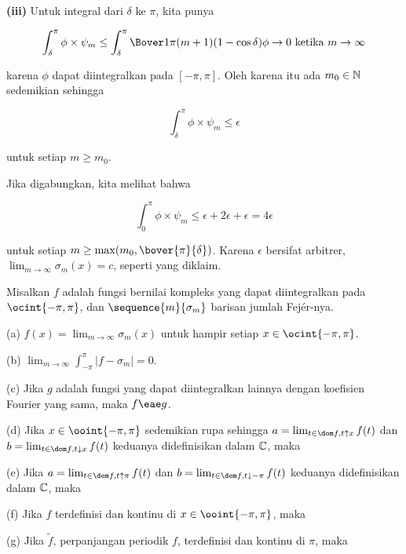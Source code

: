 {\medskip

{\bf (iii)} Untuk integral dari $\delta$ ke $\pi$, kita punya

$$\int_{\delta}^{\pi}\phi\times\psi_m
\le\int_{\delta}^{\pi}\Bover1{\pi(m+1)(1-\cos\delta)}\phi
\to 0\text{ ketika }m\to\infty$$

\noindent karena $\phi$ dapat diintegralkan pada $[-\pi,\pi]$.   Oleh karena itu
ada $m_0\in\Bbb N$ sedemikian sehingga

$$\int_{\delta}^{\pi}\phi\times\psi_m\le\epsilon$$

\noindent untuk setiap $m\ge m_0$.

\medskip

Jika digabungkan, kita melihat bahwa

$$\int_0^{\pi}\phi\times\psi_m
\le\epsilon+2\epsilon
+\epsilon= 4\epsilon$$

\noindent untuk setiap $m\ge \max(m_0,\bover{\pi}{\delta})$.   Karena
$\epsilon$ bersifat arbitrer,
$\lim_{m\to\infty}\sigma_m(x)=c$, seperti yang diklaim.
}%

 Misalkan $f$ adalah fungsi bernilai kompleks yang dapat
diintegralkan pada $\ocint{-\pi,\pi}$, dan $\sequence{m}{\sigma_m}$ barisan
jumlah Fej\'er-nya.

(a) $f(x)=\lim_{m\to\infty}\sigma_m(x)$ untuk hampir setiap
$x\in\ocint{-\pi,\pi}$.

(b) $\lim_{m\to\infty}\int_{-\pi}^{\pi}|f-\sigma_m|=0$.

(c) Jika $g$ adalah fungsi yang dapat diintegralkan lainnya dengan koefisien Fourier
yang sama, maka $f\eae g$.

(d) Jika $x\in\ooint{-\pi,\pi}$ sedemikian rupa sehingga
$a=\lim_{t\in\dom f,t\uparrow
x}f(t)$ dan $b=\lim_{t\in\dom f,t\downarrow x}f(t)$ keduanya didefinisikan dalam
$\Bbb C$, maka


(e) Jika $a=\lim_{t\in\dom f,t\uparrow \pi}f(t)$ dan $b=\lim_{t\in\dom
f,t\downarrow -\pi}f(t)$ keduanya didefinisikan dalam $\Bbb C$, maka


(f) Jika $f$ terdefinisi dan kontinu di $x\in\ooint{-\pi,\pi}$, maka


(g) Jika $\tilde f$, perpanjangan periodik $f$, terdefinisi dan
kontinu di $\pi$, maka

